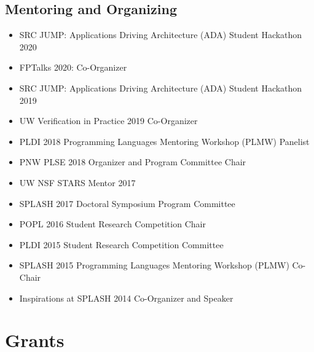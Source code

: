 \documentclass[10pt]{article}
\begin{document}
\subsection*{Mentoring and Organizing}

\begin{itemize}
  \item SRC JUMP: Applications Driving Architecture (ADA) Student Hackathon 2020
  \item FPTalks 2020: Co-Organizer
  \item SRC JUMP: Applications Driving Architecture (ADA) Student Hackathon 2019
  \item UW Verification in Practice 2019 Co-Organizer
  \item PLDI 2018 Programming Languages Mentoring Workshop (PLMW) Panelist
  \item PNW PLSE 2018 Organizer and Program Committee Chair
  \item UW NSF STARS Mentor 2017
  \item SPLASH 2017 Doctoral Symposium Program Committee
  \item POPL 2016 Student Research Competition Chair
  \item PLDI 2015 Student Research Competition Committee
  \item SPLASH 2015 Programming Languages Mentoring Workshop (PLMW) Co-Chair
  \item Inspirations at SPLASH 2014 Co-Organizer and Speaker
\end{itemize}





\section*{Grants}
\end{document}

